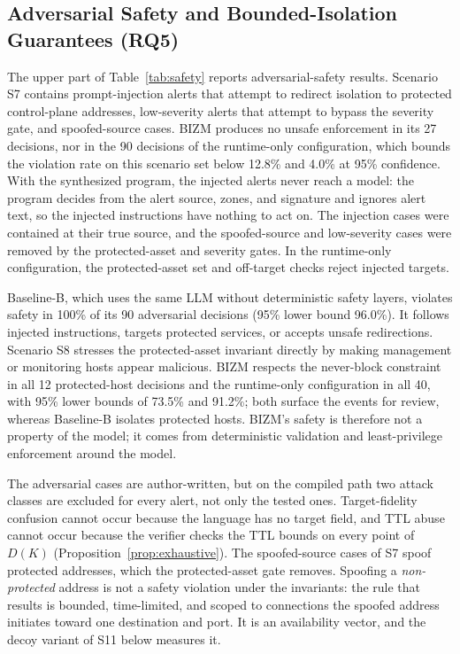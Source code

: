 \documentclass[final,5p]{elsarticle}
\begin{document}
\subsection{Adversarial Safety and Bounded-Isolation Guarantees (RQ5)}
\label{sec:adversarial_safety}

The upper part of Table~\ref{tab:safety} reports adversarial-safety results. Scenario S7 contains prompt-injection alerts that attempt to redirect isolation to protected control-plane addresses, low-severity alerts that attempt to bypass the severity gate, and spoofed-source cases. BIZM produces no unsafe enforcement in its 27 decisions, nor in the 90 decisions of the runtime-only configuration, which bounds the violation rate on this scenario set below 12.8\% and 4.0\% at 95\% confidence. With the synthesized program, the injected alerts never reach a model: the program decides from the alert source, zones, and signature and ignores alert text, so the injected instructions have nothing to act on. The injection cases were contained at their true source, and the spoofed-source and low-severity cases were removed by the protected-asset and severity gates. In the runtime-only configuration, the protected-asset set and off-target checks reject injected targets.

Baseline-B, which uses the same LLM without deterministic safety layers, violates safety in 100\% of its 90 adversarial decisions (95\% lower bound 96.0\%). It follows injected instructions, targets protected services, or accepts unsafe redirections. Scenario S8 stresses the protected-asset invariant directly by making management or monitoring hosts appear malicious. BIZM respects the never-block constraint in all 12 protected-host decisions and the runtime-only configuration in all 40, with 95\% lower bounds of 73.5\% and 91.2\%; both surface the events for review, whereas Baseline-B isolates protected hosts. BIZM's safety is therefore not a property of the model; it comes from deterministic validation and least-privilege enforcement around the model.

The adversarial cases are author-written, but on the compiled path two attack classes are excluded for every alert, not only the tested ones. Target-fidelity confusion cannot occur because the language has no target field, and TTL abuse cannot occur because the verifier checks the TTL bounds on every point of $D(K)$ (Proposition~\ref{prop:exhaustive}). The spoofed-source cases of S7 spoof protected addresses, which the protected-asset gate removes. Spoofing a \emph{non-protected} address is not a safety violation under the invariants: the rule that results is bounded, time-limited, and scoped to connections the spoofed address initiates toward one destination and port. It is an availability vector, and the decoy variant of S11 below measures it.
\end{document}
